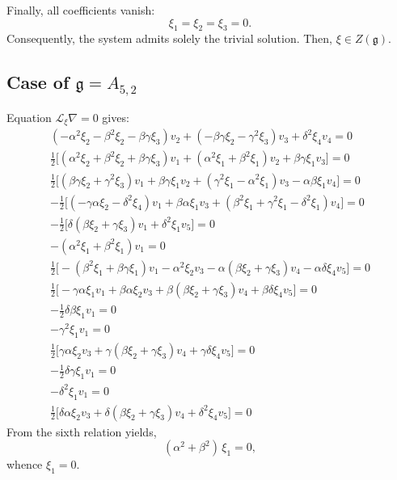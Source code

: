 \documentclass[10pt]{article}
\begin{document}
\noindent
Finally,  
all coefficients vanish:
\[
\xi_1=\xi_2=\xi_3=0.
\]
Consequently, the system admits solely the trivial solution. Then, $\xi\in Z(\mathfrak{g}).$
\subsection{Case of $\mathfrak{g}=A_{5,2}$}

Equation $\mathscr{L}_\xi\nabla=0$ gives: \begin{eqnarray}
(-\alpha^2\xi_2 - \beta^2\xi_2 - \beta\gamma\xi_3)v_2 + (-\beta\gamma\xi_2 - \gamma^2\xi_3)v_3 + \delta^2\xi_4v_4=0\\
\tfrac{1}{2}\Big[(\alpha^2\xi_2 + \beta^2\xi_2 + \beta\gamma\xi_3)v_1 + (\alpha^2\xi_1 + \beta^2\xi_1)v_2 + \beta\gamma\xi_1v_3\Big] =0\\
\tfrac{1}{2}\Big[(\beta\gamma\xi_2 + \gamma^2\xi_3)v_1 + \beta\gamma\xi_1v_2 + (\gamma^2\xi_1 - \alpha^2\xi_1)v_3 - \alpha\beta\xi_1v_4\Big] =0\\
-\tfrac{1}{2}\Big[(-\gamma\alpha\xi_2 - \delta^2\xi_4)v_1 + \beta\alpha\xi_1v_3 + (\beta^2\xi_1 + \gamma^2\xi_1 - \delta^2\xi_1)v_4\Big] =0\\
-\tfrac{1}{2}\Big[\delta(\beta\xi_2 + \gamma\xi_3)v_1 + \delta^2\xi_1v_5\Big] =0\\
-(\alpha^2\xi_1 + \beta^2\xi_1)v_1 =0\\
\tfrac{1}{2}\Big[-(\beta^2\xi_1 + \beta\gamma\xi_1)v_1 - \alpha^2\xi_2v_3 - \alpha(\beta\xi_2 + \gamma\xi_3)v_4 - \alpha\delta\xi_4v_5\Big] =0\\
\tfrac{1}{2}\Big[-\gamma\alpha\xi_1v_1 + \beta\alpha\xi_2v_3 + \beta(\beta\xi_2 + \gamma\xi_3)v_4 + \beta\delta\xi_4v_5\Big]=0\\
-\tfrac{1}{2}\delta\beta\xi_1v_1=0\\
-\gamma^2\xi_1v_1 =0\\ \tfrac{1}{2}\Big[\gamma\alpha\xi_2v_3 + \gamma(\beta\xi_2 + \gamma\xi_3)v_4 + \gamma\delta\xi_4v_5\Big] =0\\
-\tfrac{1}{2}\delta\gamma\xi_1v_1 =0\\
-\delta^2\xi_1v_1 =0\\ \tfrac{1}{2}\Big[\delta\alpha\xi_2v_3 + \delta(\beta\xi_2 + \gamma\xi_3)v_4 + \delta^2\xi_4v_5\Big]=0
\end{eqnarray}
From the sixth relation yields,
\[ (\alpha^2+\beta^2)\,\xi_1=0,
\]
whence $\xi_1=0$.
\end{document}
